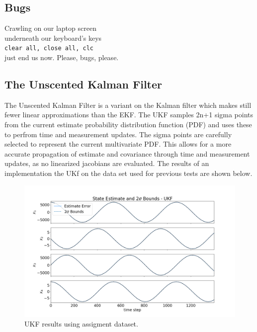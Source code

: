 \documentclass[11pt, a4paper]{article}
\begin{document}
\subsection{Bugs}
Crawling on our laptop screen \\
underneath our keyboard's keys \\
\texttt{clear all, close all, clc} \\
just end us now. Please, bugs, please. \\
 
\subsection{The Unscented Kalman Filter}
The Unscented Kalman Filter is a variant on the Kalman filter which makes still fewer linear approximations than the EKF. 
The UKF samples 2n+1 sigma points from the current estimate probability distribution function (PDF) and uses these to perfrom time and measurement updates.
The sigma points are carefully selected to represent the current multivariate PDF. 
This allows for a more accurate propagation of estimate and covariance through time and measurement updates, as no linearized jacobians are evaluated. 
The results of an implementation the UKf on the data set used for previous tests are shown below.

\begin{figure}[H]
	\centering
	\includegraphics[width=\textwidth]{Figures/ukf_dataset_est.png}
	\caption{UKF results using assigment dataset.}
	\label{fig:ukf_dataset}
\end{figure}
\end{document}
